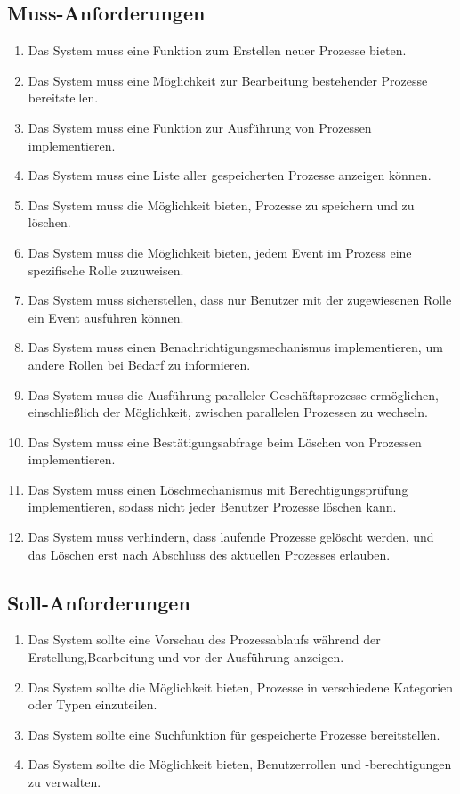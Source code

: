 \subsection*{Muss-Anforderungen}
\begin{enumerate}[label=\textbf{M\arabic*.}]
    \item Das System muss eine Funktion zum Erstellen neuer Prozesse bieten.
    \item Das System muss eine Möglichkeit zur Bearbeitung bestehender Prozesse bereitstellen.
    \item Das System muss eine Funktion zur Ausführung von Prozessen implementieren.
    \item Das System muss eine Liste aller gespeicherten Prozesse anzeigen können.
    \item Das System muss die Möglichkeit bieten, Prozesse zu speichern und zu löschen.
    \item Das System muss die Möglichkeit bieten, jedem Event im Prozess eine spezifische Rolle zuzuweisen. \label{M6}
    \item Das System muss sicherstellen, dass nur Benutzer mit der zugewiesenen Rolle ein Event ausführen können. \label{M7}
    \item Das System muss einen Benachrichtigungsmechanismus implementieren, um andere Rollen bei Bedarf zu informieren. \label{M8}
    \item Das System muss die Ausführung paralleler Geschäftsprozesse ermöglichen, einschließlich der Möglichkeit, zwischen parallelen Prozessen zu wechseln.
    \item Das System muss eine Bestätigungsabfrage beim Löschen von Prozessen implementieren.
    \item Das System muss einen Löschmechanismus mit Berechtigungsprüfung implementieren, sodass nicht jeder Benutzer Prozesse löschen kann.
    \item Das System muss verhindern, dass laufende Prozesse gelöscht werden, und das Löschen erst nach Abschluss des aktuellen Prozesses erlauben.
\end{enumerate}
\subsection*{Soll-Anforderungen}
\begin{enumerate}[label=\textbf{S\arabic*.}]
    \item Das System sollte eine Vorschau des Prozessablaufs während der Erstellung,Bearbeitung und vor der Ausführung anzeigen.
    \item Das System sollte die Möglichkeit bieten, Prozesse in verschiedene Kategorien oder Typen einzuteilen.
    \item Das System sollte eine Suchfunktion für gespeicherte Prozesse bereitstellen.
    \item Das System sollte die Möglichkeit bieten, Benutzerrollen und -berechtigungen zu verwalten.
\end{enumerate}
